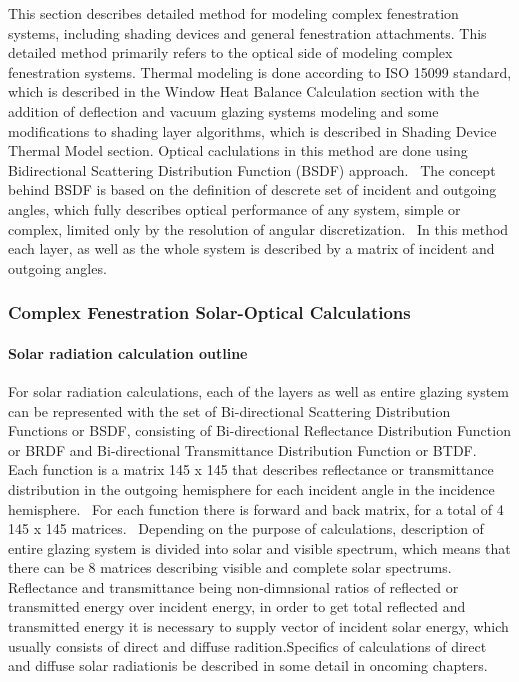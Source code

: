 This section describes detailed method for modeling complex fenestration systems, including shading devices and general fenestration attachments. This detailed method primarily refers to the optical side of modeling complex fenestration systems. Thermal modeling is done according to ISO 15099 standard, which is described in the Window Heat Balance Calculation section with the addition of deflection and vacuum glazing systems modeling and some modifications to shading layer algorithms, which is described in Shading Device Thermal Model section. Optical caclulations in this method are done using Bidirectional Scattering Distribution Function (BSDF) approach.~ The concept behind BSDF is based on the definition of descrete set of incident and outgoing angles, which fully describes optical performance of any system, simple or complex, limited only by the resolution of angular discretization.~ In this method each layer, as well as the whole system is described by a matrix of incident and outgoing angles.

\subsubsection{Complex Fenestration Solar-Optical Calculations}\label{complex-fenestration-solar-optical-calculations}

\paragraph{\textbf{Solar radiation calculation outline}}\label{solar-radiation-calculation-outline}

For solar radiation calculations, each of the layers as well as entire glazing system can be represented with the set of Bi-directional Scattering Distribution Functions or BSDF, consisting of Bi-directional Reflectance Distribution Function or BRDF and Bi-directional Transmittance Distribution Function or BTDF.~ Each function is a matrix 145 x 145 that describes reflectance or transmittance distribution in the outgoing hemisphere for each incident angle in the incidence hemisphere.~ For each function there is forward and back matrix, for a total of 4 145 x 145 matrices.~ Depending on the purpose of calculations, description of entire glazing system is divided into solar and visible spectrum, which means that there can be 8 matrices describing visible and complete solar spectrums.~ Reflectance and transmittance being non-dimnsional ratios of reflected or transmitted energy over incident energy, in order to get total reflected and transmitted energy it is necessary to supply vector of incident solar energy, which usually consists of direct and diffuse radition.Specifics of calculations of direct and diffuse solar radiationis be described in some detail in oncoming chapters.

